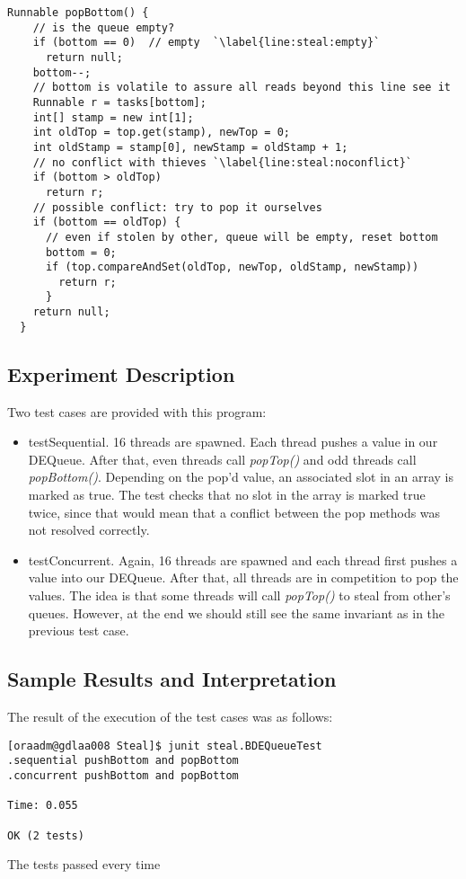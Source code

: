 \par
\hfill
\begin{lstlisting}[style=numbers]
  Runnable popBottom() {
    // is the queue empty?
    if (bottom == 0)  // empty  `\label{line:steal:empty}`
      return null;
    bottom--;
    // bottom is volatile to assure all reads beyond this line see it
    Runnable r = tasks[bottom];
    int[] stamp = new int[1];
    int oldTop = top.get(stamp), newTop = 0;
    int oldStamp = stamp[0], newStamp = oldStamp + 1;
    // no conflict with thieves `\label{line:steal:noconflict}`
    if (bottom > oldTop)
      return r;
    // possible conflict: try to pop it ourselves
    if (bottom == oldTop) {
      // even if stolen by other, queue will be empty, reset bottom
      bottom = 0;
      if (top.compareAndSet(oldTop, newTop, oldStamp, newStamp))
        return r;
      } 
    return null;
  }
\end{lstlisting}
\hfill
\par
\subsection{Experiment Description}
\par
Two test cases are provided with this program:
\begin{itemize}
\item testSequential. 16 threads are spawned. Each thread pushes a value in our
DEQueue. After that, even threads call \textit{popTop()} and odd threads call
\textit{popBottom()}. Depending on the pop'd value, an associated slot in an
array is marked as true. The test checks that no slot in the array is marked
true twice, since that would mean that a conflict between the pop methods was
not resolved correctly.
\item testConcurrent. Again, 16 threads are spawned and each thread first pushes
a value into our DEQueue. After that, all threads are in competition to pop the
values. The idea is that some threads will call \textit{popTop()} to steal from
other's queues. However, at the end we should still see the same invariant as in
the previous test case.
\end{itemize}
\par
\subsection{Sample Results and Interpretation}
\par
The result of the execution of the test cases was as follows:
\par
\hfill
\begin{verbatim}
[oraadm@gdlaa008 Steal]$ junit steal.BDEQueueTest
.sequential pushBottom and popBottom
.concurrent pushBottom and popBottom

Time: 0.055

OK (2 tests)
\end{verbatim}
\hfill
\par
The tests passed every time
